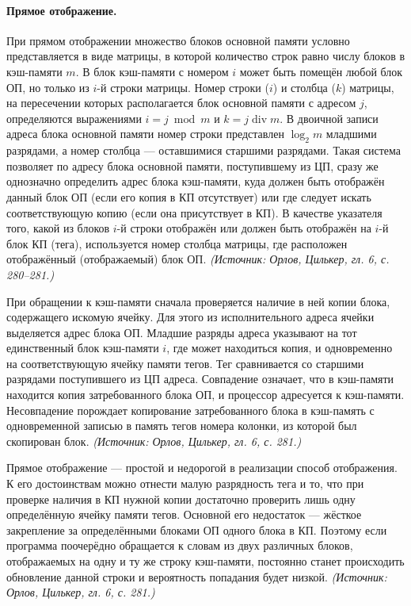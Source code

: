\documentclass[a4paper,12pt]{article}
\begin{document}
\paragraph{Прямое отображение.}
При прямом отображении множество блоков основной памяти условно представляется в виде матрицы, в которой количество строк равно числу блоков в кэш-памяти \(m\). В блок кэш-памяти с номером \(i\) может быть помещён любой блок ОП, но только из \(i\)-й строки матрицы. Номер строки (\(i\)) и столбца (\(k\)) матрицы, на пересечении которых располагается блок основной памяти с адресом \(j\), определяются выражениями \(i=j\bmod m\) и \(k=j\operatorname{div} m\). В двоичной записи адреса блока основной памяти номер строки представлен \(\log_2 m\) младшими разрядами, а номер столбца --- оставшимися старшими разрядами. Такая система позволяет по адресу блока основной памяти, поступившему из ЦП, сразу же однозначно определить адрес блока кэш-памяти, куда должен быть отображён данный блок ОП (если его копия в КП отсутствует) или где следует искать соответствующую копию (если она присутствует в КП). В качестве указателя того, какой из блоков \(i\)-й строки отображён или должен быть отображён на \(i\)-й блок КП (тега), используется номер столбца матрицы, где расположен отображённый (отображаемый) блок ОП.
\textit{(Источник: Орлов, Цилькер, гл. 6, с. 280--281.)}

При обращении к кэш-памяти сначала проверяется наличие в ней копии блока, содержащего искомую ячейку. Для этого из исполнительного адреса ячейки выделяется адрес блока ОП. Младшие разряды адреса указывают на тот единственный блок кэш-памяти \(i\), где может находиться копия, и одновременно на соответствующую ячейку памяти тегов. Тег сравнивается со старшими разрядами поступившего из ЦП адреса. Совпадение означает, что в кэш-памяти находится копия затребованного блока ОП, и процессор адресуется к кэш-памяти. Несовпадение порождает копирование затребованного блока в кэш-память с одновременной записью в память тегов номера колонки, из которой был скопирован блок.
\textit{(Источник: Орлов, Цилькер, гл. 6, с. 281.)}

Прямое отображение --- простой и недорогой в реализации способ отображения. К его достоинствам можно отнести малую разрядность тега и то, что при проверке наличия в КП нужной копии достаточно проверить лишь одну определённую ячейку памяти тегов. Основной его недостаток --- жёсткое закрепление за определёнными блоками ОП одного блока в КП. Поэтому если программа поочерёдно обращается к словам из двух различных блоков, отображаемых на одну и ту же строку кэш-памяти, постоянно станет происходить обновление данной строки и вероятность попадания будет низкой.
\textit{(Источник: Орлов, Цилькер, гл. 6, с. 281.)}
\end{document}
